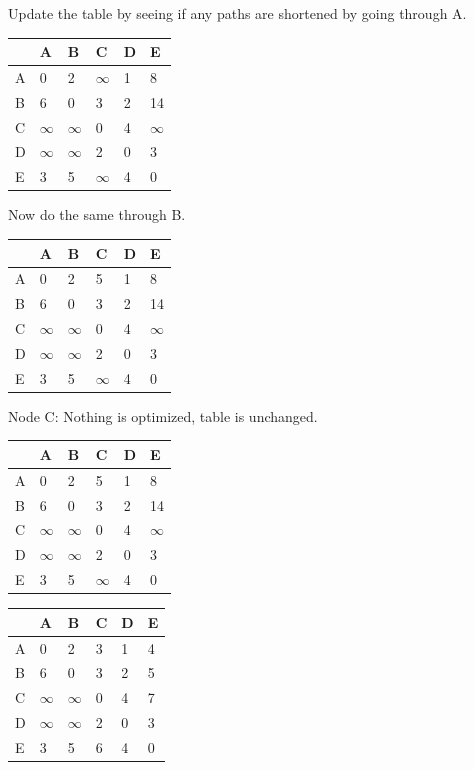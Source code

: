 \documentclass{article}
\begin{document}
\begin{enumerate}
Update the table by seeing if any paths are shortened by going through A. 

\begin{table}[H]
\begin{tabular}{|l|l|l|l|l|l|}
\hline
 & A & B & C & D & E \\ \hline
A & 0 & 2 & $\infty$ & 1 & 8 \\ \hline
B & 6 & 0 & 3 & 2 & 14 \\ \hline
C & $\infty$ & $\infty$ & 0 & 4 & $\infty$ \\ \hline
D & $\infty$ & $\infty$ & 2 & 0 & 3 \\ \hline
E & 3 & 5 & $\infty$ & 4 & 0 \\ \hline
\end{tabular}
\end{table}

Now do the same through B. 
\begin{table}[H]
\begin{tabular}{|l|l|l|l|l|l|}
\hline
 & A & B & C & D & E \\ \hline
A & 0 & 2 & 5 & 1 & 8 \\ \hline
B & 6 & 0 & 3 & 2 & 14 \\ \hline
C & $\infty$ & $\infty$ & 0 & 4 & $\infty$ \\ \hline
D & $\infty$ & $\infty$ & 2 & 0 & 3 \\ \hline
E & 3 & 5 & $\infty$ & 4 & 0 \\ \hline
\end{tabular}
\end{table}

Node C: Nothing is optimized, table is unchanged. 

\begin{table}[H]
\begin{tabular}{|l|l|l|l|l|l|}
\hline
 & A & B & C & D & E \\ \hline
A & 0 & 2 & 5 & 1 & 8 \\ \hline
B & 6 & 0 & 3 & 2 & 14 \\ \hline
C & $\infty$ & $\infty$ & 0 & 4 & $\infty$ \\ \hline
D & $\infty$ & $\infty$ & 2 & 0 & 3 \\ \hline
E & 3 & 5 & $\infty$ & 4 & 0 \\ \hline
\end{tabular}
\end{table}



\begin{table}[H]
\begin{tabular}{|l|l|l|l|l|l|}
\hline
 & A & B & C & D & E \\ \hline
A & 0 & 2 & 3 & 1 & 4 \\ \hline
B & 6 & 0 & 3 & 2 & 5 \\ \hline
C & $\infty$ & $\infty$ & 0 & 4 & 7 \\ \hline
D & $\infty$ & $\infty$ & 2 & 0 & 3 \\ \hline
E & 3 & 5 & 6 & 4 & 0 \\ \hline
\end{tabular}
\end{table}



\end{enumerate}
\end{document}
